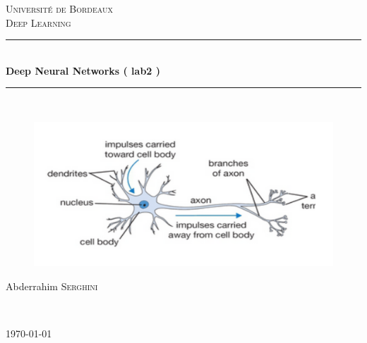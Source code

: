\documentclass[a4paper,12pt,twoside]{report}
\begin{document}


\begin{titlepage}
	
	\newcommand{\HRule}{\rule{\linewidth}{0.5mm}} 
	\center
	
	
	\textsc{\LARGE Université de Bordeaux }\\[1.5cm] %
	\textsc{\Large Deep Learning}\\[0.5cm] %
	
	\HRule \\[0.4cm]
	{ \huge \bfseries Deep Neural Networks ( lab2 )
}\\[0.4cm] %
	\HRule \\[1.5cm]
	
	\hfill
	
	\begin{figure}[H]
	\centering
	\includegraphics[scale=0.6]{Bio_Neuron.png} 
	\end{figure}

	
	\begin{minipage}{0.4\textwidth}
		\begin{flushleft} \large
			Abderrahim \textsc{Serghini}\\
		\end{flushleft}
	\end{minipage}
	~
	
	
	{\large \today}\\[2cm]
	
\end{titlepage}
\end{document}
